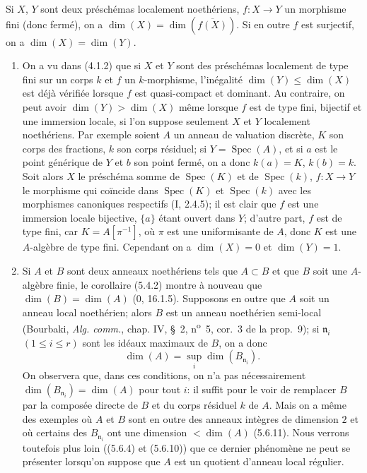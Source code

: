 \begin{corollary}[5.4.2]
\label{IV.2.s5.4.2-fr}
Si $X$, $Y$ sont deux préschémas localement noethériens, $f:X\to Y$ un
morphisme fini (donc fermé), on a
$\dim(X)=\dim(\overline{f(X)})$. Si en outre $f$ est surjectif, on a
$\dim(X)=\dim(Y)$.
\end{corollary}

\begin{remarks}[5.4.3]
\label{IV.2.s5.4.3-fr}
\begin{enumerate}
\item[(i)] On a vu dans (4.1.2) que si $X$ et $Y$ sont des préschémas
localement de type fini sur un corps $k$ et $f$ un $k$-morphisme, l'inégalité
$\dim(Y)\leq\dim(X)$ est déjà vérifiée lorsque $f$ est quasi-compact et
dominant. Au contraire, on peut avoir $\dim(Y)>\dim(X)$ même lorsque $f$ est
de type fini, bijectif et une immersion locale, si l'on suppose seulement
$X$ et $Y$ localement noethériens. Par exemple soient $A$ un anneau de
valuation discrète, $K$ son corps des fractions, $k$ son corps résiduel; si
$Y=\operatorname{Spec}(A)$, et si $a$ est le point générique de $Y$ et $b$
son point fermé, on a donc $k(a)=K$, $k(b)=k$. Soit alors $X$ le préschéma
somme de $\operatorname{Spec}(K)$ et de $\operatorname{Spec}(k)$,
$f:X\to Y$ le morphisme qui coïncide dans $\operatorname{Spec}(K)$ et
$\operatorname{Spec}(k)$ avec les morphismes canoniques respectifs
(I, 2.4.5); il est clair que $f$ est une immersion locale bijective, $\{a\}$
étant ouvert dans $Y$; d'autre part, $f$ est de type fini, car
$K=A[\pi^{-1}]$, où $\pi$ est une uniformisante de $A$, donc $K$ est une
$A$-algèbre de type fini. Cependant on a $\dim(X)=0$ et $\dim(Y)=1$.

\item[(ii)] Si $A$ et $B$ sont deux anneaux noethériens tels que $A\subset B$
et que $B$ soit une $A$-algèbre finie, le corollaire (5.4.2) montre à nouveau
que $\dim(B)=\dim(A)$ (0, 16.1.5). Supposons en outre que $A$ soit un anneau
local noethérien; alors $B$ est un anneau noethérien semi-local (Bourbaki,
\emph{Alg. comm.}, chap. IV, \S~2, n\textsuperscript{o}~5, cor.~3 de la
prop.~9); si $\mathfrak n_i$ $(1\leq i\leq r)$ sont les idéaux maximaux de
$B$, on a donc
\begin{equation}
\dim(A)=\sup_i\dim(B_{\mathfrak n_i}).
\tag{5.4.3.1}\label{IV.2.s5.4.3.1-fr}
\end{equation}
On observera que, dans ces conditions, on n'a pas nécessairement
$\dim(B_{\mathfrak n_i})=\dim(A)$ pour tout $i$: il suffit pour le voir de
remplacer $B$ par la composée directe de $B$ et du corps résiduel $k$ de
$A$. Mais on a même des exemples où $A$ et $B$ sont en outre des anneaux
intègres de dimension $2$ et où certains des $B_{\mathfrak n_i}$ ont une
dimension $<\dim(A)$ (5.6.11). Nous verrons toutefois plus loin ((5.6.4) et
(5.6.10)) que ce dernier phénomène ne peut se présenter lorsqu'on suppose
que $A$ est un quotient d'anneau local régulier.
\end{enumerate}
\end{remarks}

